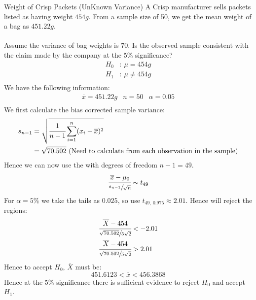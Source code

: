 \begin{examplebox}{Weight of Crisp Packets (UnKnown Variance)}
	A Crisp manufacturer sells packets listed as having weight $454g$. From a sample size of 50, we get the mean weight of a bag as $451.22g$.
	\\
	\\ Assume the variance of bag weights is $70$. Is the observed sample consistent with the claim made by the company at the 5\% significance?
	\tcblower
    \[\begin{split}
			H_0 &: \ \mu = 454g \\
			H_1 &: \ \mu \neq 454g \\
		\end{split}\]
	We have the following information:
	\[\begin{matrix}
			\overline{x} = 451.22g & n = 50 & \alpha = 0.05 \\
		\end{matrix}\]
	We first calculate the bias corrected sample variance:
	\[\begin{split}
			s_{n-1} &= \sqrt{
				\cfrac{1}{n-1}\sum_{i=1}^n(x_i - \overline{x})^2
			} \\
			&= \sqrt{70.502} \ (\text{Need to calculate from each observation in the sample})
		\end{split}\]
	Hence we can now use the  with degrees of freedom $n - 1 = 49$.
	\[\cfrac{\overline{x} - \mu_0}{\sfrac{s_{n-1}}{\sqrt{n}}} \thicksim t_{49}\]
	For $\alpha = 5\%$ we take the tails as $0.025$, so use $t_{49, \ 0.975} \approx 2.01$.
	Hence will reject the regions:
	\[\begin{split}
			\cfrac{\overline{X} - 454}{\sfrac{\sqrt{70.502}}{5\sqrt{2}}} & < -2.01 \\
			\cfrac{\overline{X} - 454}{\sfrac{\sqrt{70.502}}{5\sqrt{2}}} & > 2.01 \\
		\end{split}\]
	Hence to accept $H_0$, $\overline{X}$ must be:
	\[451.6123 < \overline{x} < 456.3868\]
	Hence at the $5\%$ significance there is sufficient evidence to reject $H_0$ and accept $H_1$.
\end{examplebox}
